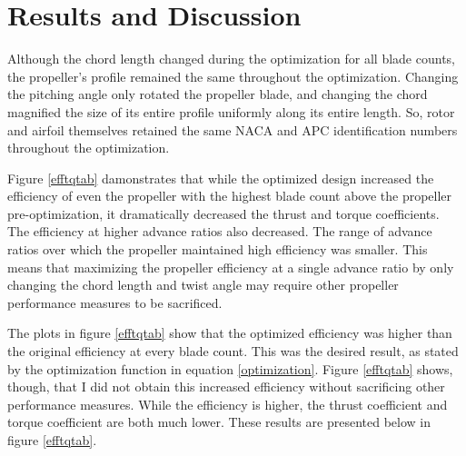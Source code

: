 \documentclass[journal ]{new-aiaa}
\begin{document}
\section{Results and Discussion}

Although the chord length changed during the optimization for all blade counts, the propeller's profile remained the same throughout the optimization. Changing the pitching angle only rotated the propeller blade, and changing the chord magnified the size of its entire profile uniformly along its entire length. So, rotor and airfoil themselves retained the same NACA and APC identification numbers throughout the optimization.

Figure \eqref{efftqtab} damonstrates that while the optimized design increased the efficiency of even the propeller with the highest blade count above the propeller pre-optimization, it dramatically decreased the thrust and torque coefficients. The efficiency at higher advance ratios also decreased. The range of advance ratios over which the propeller maintained high efficiency was smaller. This means that maximizing the propeller efficiency at a single advance ratio by only changing the chord length and twist angle may require other propeller performance measures to be sacrificed.

The plots in figure \eqref{efftqtab} show that the optimized efficiency was higher than the original efficiency at every blade count. This was the desired result, as stated by the optimization function in equation \eqref{optimization}. Figure \eqref{efftqtab} shows, though, that I did not obtain this increased efficiency without sacrificing other performance measures. While the efficiency is higher, the thrust coefficient and torque coefficient are both much lower. These results are presented below in figure \eqref{efftqtab}.
\end{document}
